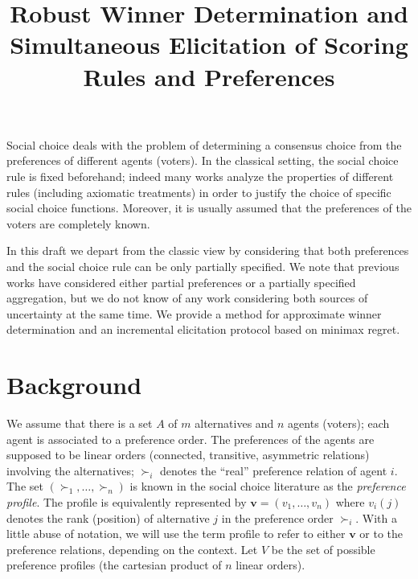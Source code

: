 \documentclass[12pt]{article}
\title{Robust Winner Determination and Simultaneous Elicitation of Scoring Rules and Preferences}
\author{}
\newcommand{\preflarge}{\boldsymbol{\succeq}^\textbf{r}}%
\newcommand{\pref}{{\succ}}%
\newcommand{\ppreflarge}{\succeq^\text{p}}%
\newcommand{\ppref}{\succ^\text{p}}%
\begin{document}
\maketitle


Social choice deals with the problem of determining a consensus choice from the preferences of different agents (voters).
In the classical setting, the social choice rule is fixed beforehand; indeed many works analyze the properties of different rules (including axiomatic treatments) in order to justify the choice of specific social choice functions. 
Moreover, it is usually assumed that the preferences of the voters are completely known. 

In this draft we depart from the classic view by considering that both preferences and the social choice rule can be only partially specified.
We note that previous works have considered either partial preferences or a partially specified aggregation, but we do not know of any work considering both sources of uncertainty at the same time.
We provide a method for approximate winner determination and an incremental elicitation protocol based on minimax regret. 


\section*{Background}

We assume that there is a set $A$ of $m$ alternatives and $n$ agents (voters); each agent is associated to a preference order.
The preferences of the agents are supposed to be linear orders (connected, transitive, asymmetric relations) involving the alternatives;
$\pref_i$ denotes the ``real'' preference relation of agent $i$. 
The set $(\pref_1,\ldots,\pref_n)$ is known in the social choice literature as the {\em preference  profile}.
The profile is equivalently represented by $\textbf{v}=(v_1,\ldots,v_n)$ where $v_i(j)$ denotes the rank (position) of alternative $j$ in the preference order $\pref_i$. 
With a little abuse of notation, we will use the term profile to refer to either $\textbf{v}$ or to the preference relations, depending on the context.
Let $V$ be the set of possible preference profiles (the cartesian product of $n$ linear orders).
\end{document}
